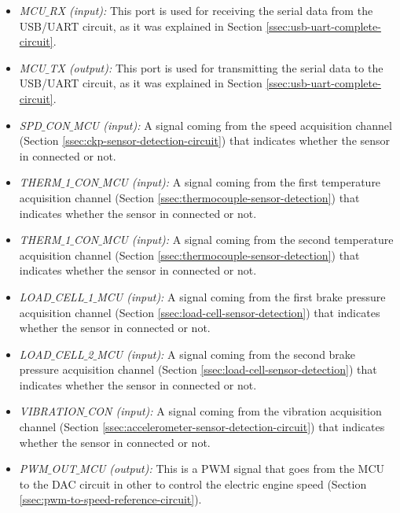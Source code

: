 				\begin{itemize}
					\item \textit{MCU$\_$RX (input):} This port is used for receiving the serial data from the USB/UART circuit, as it was explained in Section \ref{ssec:usb-uart-complete-circuit}.\label{itm:mcu-port-mcu-rx}
					\item \textit{MCU$\_$TX (output):} This port is used for transmitting the serial data to the USB/UART circuit, as it was explained in Section \ref{ssec:usb-uart-complete-circuit}.\label{itm:mcu-port-mcu-tx}
					\item \textit{SPD$\_$CON$\_$MCU (input):} A signal coming from the speed acquisition channel (Section \ref{ssec:ckp-sensor-detection-circuit}) that indicates whether the sensor in connected or not.\label{itm:mcu-port-spd-con-mcu}
					\item \textit{THERM$\_$1$\_$CON$\_$MCU (input):} A signal coming from the first temperature acquisition channel (Section \ref{ssec:thermocouple-sensor-detection}) that indicates whether the sensor in connected or not.\label{itm:mcu-port-therm1-con-mcu}
					\item \textit{THERM$\_$1$\_$CON$\_$MCU (input):} A signal coming from the second temperature acquisition channel (Section \ref{ssec:thermocouple-sensor-detection}) that indicates whether the sensor in connected or not.\label{itm:mcu-port-therm2-con-mcu}
					\item \textit{LOAD$\_$CELL$\_$1$\_$MCU (input):} A signal coming from the first brake pressure acquisition channel (Section \ref{ssec:load-cell-sensor-detection}) that indicates whether the sensor in connected or not.\label{itm:mcu-port-load-cell-1-mcu}
					\item \textit{LOAD$\_$CELL$\_$2$\_$MCU (input):} A signal coming from the second brake pressure acquisition channel (Section \ref{ssec:load-cell-sensor-detection}) that indicates whether the sensor in connected or not.\label{itm:mcu-port-load-cell-2-mcu}
					\item \textit{VIBRATION$\_$CON (input):} A signal coming from the vibration acquisition channel (Section \ref{ssec:accelerometer-sensor-detection-circuit}) that indicates whether the sensor in connected or not.\label{itm:mcu-port-vibration-con}
					\item \textit{PWM$\_$OUT$\_$MCU (output):} This is a PWM signal that goes from the MCU to the DAC circuit in other to control the electric engine speed (Section \ref{ssec:pwm-to-speed-reference-circuit}).\label{itm:mcu-port-pwm-out-mcu}

\end{itemize}
